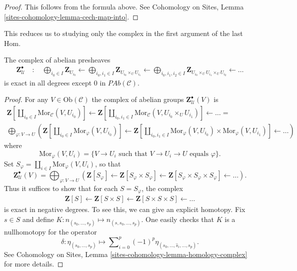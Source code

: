 \begin{proof}
This follows from the formula above. See
Cohomology on Sites, Lemma \ref{sites-cohomology-lemma-cech-map-into}.
\end{proof}

\noindent
This reduces us to studying only the complex in the first argument of the
last $\text{Hom}$.

\begin{lemma}
\label{lemma-exact}
The complex of abelian presheaves
\begin{align*}
\mathbf{Z}_{\mathcal{U}}^\bullet \quad : \quad
\bigoplus_{i_0 \in I} \mathbf{Z}_{U_{i_0}} \leftarrow
\bigoplus_{i_0, i_1 \in I} \mathbf{Z}_{U_{i_0} \times_U U_{i_1}} \leftarrow
\bigoplus_{i_0, i_1, i_2 \in I}
\mathbf{Z}_{U_{i_0} \times_U U_{i_1} \times_U U_{i_2}} \leftarrow
\ldots
\end{align*}
is exact in all degrees except $0$ in $\textit{PAb}(\mathcal{C})$.
\end{lemma}

\begin{proof}
For any $V\in \text{Ob}(\mathcal{C})$ the complex of abelian groups
$\mathbf{Z}_{\mathcal{U}}^\bullet(V)$ is
$$
\begin{matrix}
\displaystyle
\mathbf{Z}\left[
\coprod_{i_0\in I} \text{Mor}_{\mathcal{C}}(V, U_{i_0})\right]
\leftarrow
\mathbf{Z}\left[
\coprod_{i_0, i_1 \in I}
\text{Mor}_{\mathcal{C}}(V, U_{i_0} \times_U U_{i_1})\right]
\leftarrow \ldots = \\
\displaystyle
\bigoplus_{\varphi: V \to U}
\left(
\mathbf{Z}\left[\coprod_{i_0 \in I} \text{Mor}_\varphi(V, U_{i_0})\right]
\leftarrow
\mathbf{Z}\left[\coprod_{i_0, i_1\in I} \text{Mor}_\varphi(V, U_{i_0}) \times
\text{Mor}_\varphi(V, U_{i_1})\right]
\leftarrow
\ldots
\right)
\end{matrix}
$$
where
$$
\text{Mor}_{\varphi}(V, U_i)
=
\{ V \to U_i \text{ such that } V \to U_i \to U \text{ equals } \varphi \}.
$$
Set $S_\varphi = \coprod_{i\in I} \text{Mor}_\varphi(V, U_i)$, so that
$$
\mathbf{Z}_\mathcal{U}^\bullet(V)
=
\bigoplus_{\varphi: V \to U}
\left(
\mathbf{Z}[S_\varphi] \leftarrow
\mathbf{Z}[S_\varphi \times S_\varphi] \leftarrow
\mathbf{Z}[S_\varphi \times S_\varphi \times S_\varphi] \leftarrow
\ldots \right).
$$
Thus it suffices to show that for each $S = S_\varphi$, the complex
\begin{align*}
\mathbf{Z}[S] \leftarrow
\mathbf{Z}[S \times S] \leftarrow
\mathbf{Z}[S \times S \times S] \leftarrow \ldots
\end{align*}
is exact in negative degrees. To see this, we can give an explicit homotopy.
Fix $s\in S$ and define $K: n_{(s_0, \ldots, s_p)} \mapsto n_{(s, s_0,
\ldots, s_p)}.$ One easily checks that $K$ is a nullhomotopy for the operator
$$
\delta :
\eta_{(s_0,\ldots,s_p)}
\mapsto
\sum\nolimits_{i=0}^p (-1)^p \eta_{(s_0,\ldots, \hat s_i,\ldots, s_p)}.
$$
See
Cohomology on Sites, Lemma \ref{sites-cohomology-lemma-homology-complex}
for more details.
\end{proof}

